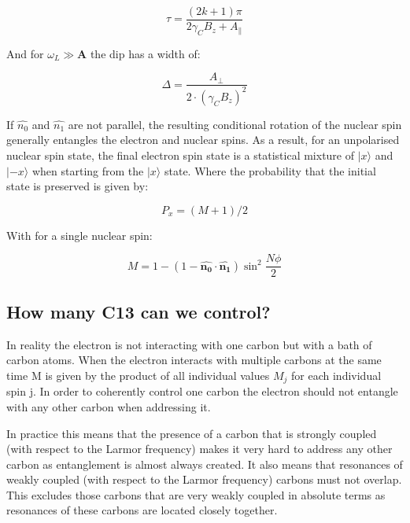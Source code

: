  \begin{equation}
\tau = \frac{(2k+1)\pi}{2 \gamma_C B_z + A_\parallel}
\label{eq:res_dip_loc}
\end{equation}

And for $\omega_L \gg \mathbf{A}$ the dip has a width of:

 \begin{equation}
\Delta = \frac{A_\perp}{2\cdot (\gamma_C B_z)^2}
\label{eq:res_dip_width}
\end{equation}

If  $\hat{n_0}$ and $\hat{n_1}$ are not parallel, the resulting conditional rotation of the nuclear spin generally entangles the electron and nuclear spins. As a result, for an unpolarised nuclear spin state, the final electron spin state is a statistical mixture of $|x\rangle$ and $|-x\rangle$ when starting from the $|x\rangle$  state. Where the probability that the initial state is preserved is given by:


\begin{equation}
P_x = (M+1)/2
\end{equation}

With for a single nuclear spin:


\begin{equation}
M = 1-(1 - \hat{\mathbf{n_0}} \cdot \hat{\mathbf{n_1}}) \sin^2 \frac{N\phi}{2}
\end{equation}

\subsection{How many C13 can we control?}
\label{howmanyc13canwecontrol}

In reality the electron is not interacting with one carbon but with a bath of carbon atoms. When the electron interacts with multiple carbons at the same time M is given by the product of all individual values $M_j$ for each individual spin j. In order to coherently control one carbon the electron should not entangle with any other carbon when addressing it.

In practice this means that the presence of a carbon that is strongly coupled (with respect to the Larmor frequency) makes it very hard to address any other carbon as entanglement is almost always created. It also means that resonances of weakly coupled (with respect to the Larmor frequency) carbons must not overlap. This excludes those carbons that are very weakly coupled in absolute terms as resonances of these carbons are located closely together.

